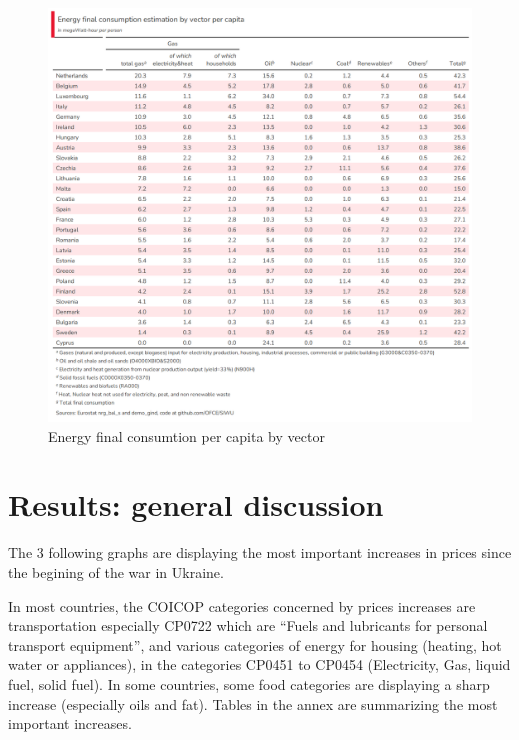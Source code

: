 \documentclass[
  9pt,
  a4paper,
  DIV=11,
  numbers=noendperiod]{scrartcl}
\begin{document}
\begin{figure}

\caption{Energy final consumtion per capita by vector}

{\centering \includegraphics[width=16cm,height=\textheight]{../svg/tab1.png}

}

\end{figure}

\hypertarget{results-general-discussion}{%
\section{Results: general discussion}\label{results-general-discussion}}

The 3 following graphs are displaying the most important increases in
prices since the begining of the war in Ukraine.

In most countries, the COICOP categories concerned by prices increases
are transportation especially CP0722 which are ``Fuels and lubricants
for personal transport equipment'', and various categories of energy for
housing (heating, hot water or appliances), in the categories CP0451 to
CP0454 (Electricity, Gas, liquid fuel, solid fuel). In some countries,
some food categories are displaying a sharp increase (especially oils
and fat). Tables in the annex are summarizing the most important
increases.
\end{document}
